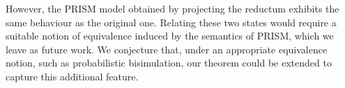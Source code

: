 \begin{remark}
  However, the PRISM model obtained by projecting the reductum
  exhibits the same behaviour as the original one.  Relating these two
  states would require a suitable notion of equivalence induced by the
  semantics of PRISM, which we leave as future work. We conjecture
  that, under an appropriate equivalence notion, such as probabilistic
  bisimulation, our theorem could be extended to capture this
  additional feature.
\end{remark}



